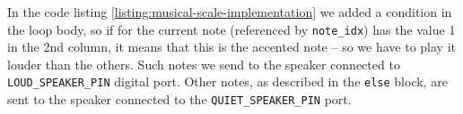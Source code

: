 \documentclass[../sparc.tex]{subfiles}
\begin{document}
In the code listing \ref{listing:musical-scale-implementation} we added a
condition in the loop body, so if for the current note (referenced by
\texttt{note\_idx}) has the value 1 in the 2nd column, it means that this is the
accented note -- so we have to play it louder than the others.  Such notes we
send to the speaker connected to \texttt{LOUD\_SPEAKER\_PIN} digital port. Other
notes, as described in the \texttt{else} block, are sent to the speaker
connected to the \texttt{QUIET\_SPEAKER\_PIN} port.
\end{document}

